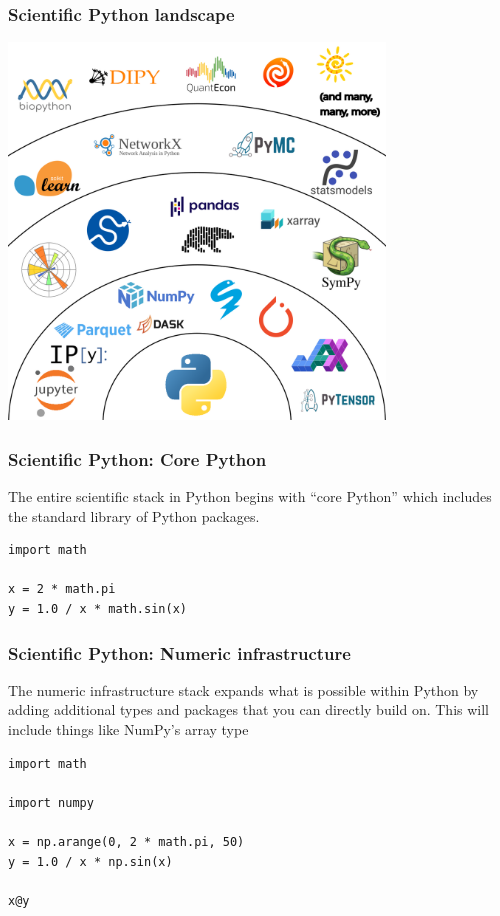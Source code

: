 \documentclass[
    xcolor={svgnames,dvipsnames},
    hyperref={colorlinks, citecolor=DeepPink4, linkcolor=DarkRed, urlcolor=DarkBlue}
]{beamer}  %
\newcommand{\1}{\mathbbm 1}
\begin{document}
\begin{frame}
    \frametitle{Scientific Python landscape}

    \begin{center}
        \includegraphics[width=0.75\textwidth]{python_landscape.png}
    \end{center}

\end{frame}

\begin{frame}[fragile]
    \frametitle{Scientific Python: Core Python}

    The entire scientific stack in Python begins with ``core Python'' which includes the standard
    library of Python packages.

    \begin{verbatim}
import math

x = 2 * math.pi
y = 1.0 / x * math.sin(x)
    \end{verbatim}

\end{frame}

\begin{frame}[fragile]
    \frametitle{Scientific Python: Numeric infrastructure}

    The numeric infrastructure stack expands what is possible within Python by adding additional
    types and packages that you can directly build on. This will include things like NumPy's
    array type

    \begin{verbatim}
import math

import numpy

x = np.arange(0, 2 * math.pi, 50)
y = 1.0 / x * np.sin(x)

x@y
    \end{verbatim}

\end{frame}
\end{document}
